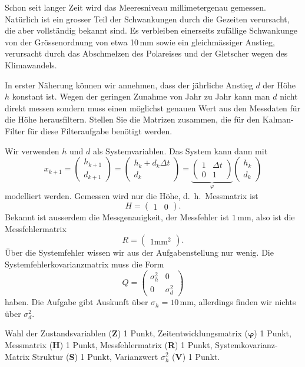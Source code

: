 Schon seit langer Zeit wird das Meeresniveau millimetergenau gemessen.
Natürlich ist ein grosser Teil der Schwankungen durch die Gezeiten
verursacht, die aber vollständig bekannt sind.
Es verbleiben einerseits zufällige Schwankunge von der
Grössenordnung von etwa 10\,mm sowie ein gleichmässiger Anstieg, verursacht
durch das Abschmelzen des Polareises und der Gletscher wegen des Klimawandels.

In erster Näherung können wir annehmen, dass der jährliche Anstieg $d$
der Höhe $h$ konstant ist.
Wegen der geringen Zunahme von Jahr zu Jahr kann man $d$ nicht direkt
messen sondern muss einen möglichst genauen Wert aus den Messdaten
für die Höhe herausfiltern.
Stellen Sie die Matrizen zusammen, die für den Kalman-Filter für diese
Filteraufgabe benötigt werden.


\begin{loesung}
Wir verwenden $h$ und $d$ als Systemvariablen.
Das System kann dann mit 
\[
x_{k+1}
=
\begin{pmatrix}
h_{k+1}\\
d_{k+1}
\end{pmatrix}
=
\begin{pmatrix}
h_k + d_k \Delta t\\
d_k
\end{pmatrix}
=
\underbrace{
\begin{pmatrix}
1&\Delta t\\
0&1
\end{pmatrix}}_{\displaystyle\varphi}
\begin{pmatrix}
h_k\\d_k
\end{pmatrix}
\]
modelliert werden.
Gemessen wird nur die Höhe, d.~h.~Messmatrix ist
\[
H=\begin{pmatrix}
1&0
\end{pmatrix}.
\]
Bekannt ist ausserdem die Messgenauigkeit, der Messfehler ist $1\,\text{mm}$,
also ist die Messfehlermatrix
\[
R=\begin{pmatrix}
1\text{mm}^2
\end{pmatrix}.
\]
Über die Systemfehler wissen wir aus der Aufgabenstellung nur wenig.
Die Systemfehlerkovarianzmatrix muss die Form
\[
Q=\begin{pmatrix}
\sigma_h^2&0\\
0&\sigma_d^2
\end{pmatrix}
\]
haben.
Die Aufgabe gibt Auskunft über $\sigma_h=10\,\text{mm}$, allerdings
finden wir nichts über $\sigma_d^2$.
\end{loesung}

\begin{bewertung}
Wahl der Zustandsvariablen ({\bf Z}) 1 Punkt,
Zeitentwicklungsmatrix ($\bm{\varphi}$) 1 Punkt,
Messmatrix ({\bf H}) 1 Punkt,
Messfehlermatrix ({\bf R}) 1 Punkt,
Systemkovarianz-Matrix Struktur ({\bf S}) 1 Punkt,
Varianzwert $\sigma_h^2$ ({\bf V}) 1 Punkt.
\end{bewertung}



